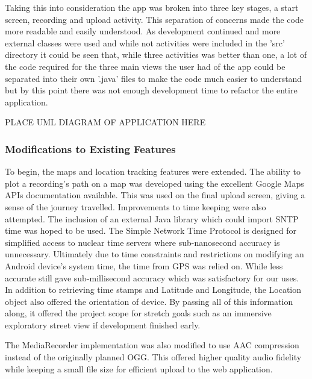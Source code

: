 \documentclass{l3proj}
\begin{document}
Taking this into consideration the app was broken into three key stages, a start screen, recording and upload activity. This separation of concerns made the code more readable and easily understood. As development continued and more external classes were used and while not activities were included in the 'src' directory it could be seen that, while three activities was better than one, a lot of the code required for the three main views the user had of the app could be separated into their own '.java' files to make the code much easier to understand but by this point there was not enough development time to refactor the entire application.

PLACE UML DIAGRAM OF APPLICATION HERE

\subsubsection{Modifications to Existing Features}
To begin, the maps and location tracking features were extended. The ability to plot a recording's path on a map was developed using the excellent Google Maps APIs documentation available. This was used on the final upload screen, giving a sense of the journey travelled. Improvements to time keeping were also attempted. The inclusion of an external Java library which could import SNTP time was hoped to be used. The Simple Network Time Protocol is designed for simplified access to nuclear time servers where sub-nanosecond accuracy is unnecessary. Ultimately due to time constraints and restrictions on modifying an Android device's system time, the time from GPS was relied on. While less accurate still gave sub-millisecond accuracy which was satisfactory for our uses. In addition to retrieving time stamps and Latitude and Longitude, the Location object also offered the orientation of device. By passing all of this information along, it offered the project scope for stretch goals such as an immersive exploratory street view if development finished early.

The MediaRecorder implementation was also modified to use AAC compression instead of the originally planned OGG. This offered higher quality audio fidelity while keeping a small file size for efficient upload to the web application.
\end{document}
